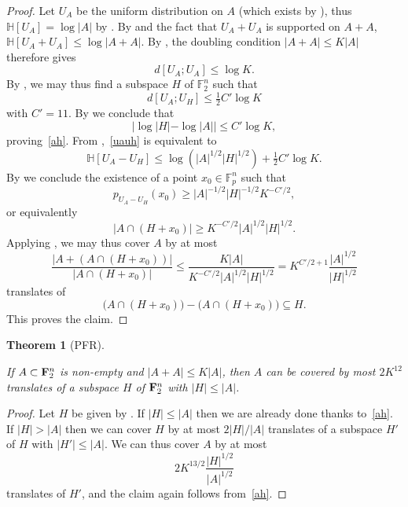 \documentclass[10pt,a4paper]{article}
\newtheorem{theorem}{Theorem}
\newcommand{\lean}[1]{}
\newcommand{\uses}[1]{}
\newcommand{\leanok}{}
\newcommand{\F}{\mathbb{F}}
\newcommand{\bbH}{\mathbb{H}}
\begin{document}
\begin{proof}
\uses{entropy-pfr, unif-exist, uniform-entropy-II, jensen-bound,ruz-dist-def,ruzsa-diff,bound-conc,ruz-cov}\leanok
  Let $U_A$ be the uniform distribution on $A$ (which exists by ), thus $\bbH[U_A] = \log |A|$ by . By  and the fact that $U_A + U_A$ is supported on $A + A$, $\bbH[U_A + U_A] \leq \log|A+A|$. By , the doubling condition $|A+A| \leq K|A|$ therefore gives
  \[d[U_A;U_A] \leq \log K.\]
  By , we may thus find a subspace $H$ of $\F_2^n$ such that
  \begin{equation}\label{uauh} d[U_A;U_H] \leq \tfrac{1}{2} C' \log K\end{equation}
  with $C' = 11$.
  By  we conclude that
  \begin{equation*}
    |\log |H| - \log |A|| \leq C' \log K,
  \end{equation*}
  proving~\eqref{ah}.
  From ,~\eqref{uauh} is equivalent to
  \[\bbH[U_A - U_H] \leq \log( |A|^{1/2} |H|^{1/2}) + \tfrac{1}{2} C' \log K.\]
  By  we conclude the existence of a point $x_0 \in \F_p^n$ such that
  \[p_{U_A-U_H}(x_0) \geq |A|^{-1/2} |H|^{-1/2} K^{-C'/2},\]
  or equivalently
  \[|A \cap (H + x_0)| \geq K^{-C'/2} |A|^{1/2} |H|^{1/2}.\]
  Applying , we may thus cover $A$ by at most
  \[\frac{|A + (A \cap (H+x_0))|}{|A \cap (H + x_0)|} \leq \frac{K|A|}{K^{-C'/2} |A|^{1/2} |H|^{1/2}} = K^{C'/2+1} \frac{|A|^{1/2}}{|H|^{1/2}}\]
  translates of
  \[\bigl(A \cap (H + x_0)\bigr) - \bigl(A \cap (H + x_0)\bigr) \subseteq H.\]
  This proves the claim.
\end{proof}


\begin{theorem}[PFR]\label{pfr}
\lean{PFR_conjecture}\leanok
If $A \subset {\bf F}_2^n$ is non-empty and $|A+A| \leq K|A|$, then $A$ can be covered by most $2K^{12}$ translates of a subspace $H$ of ${\bf F}_2^n$ with $|H| \leq |A|$.
\end{theorem}

\begin{proof}
  \uses{pfr_aux}\leanok
  Let $H$ be given by .
  If $|H| \leq |A|$ then we are already done thanks to~\eqref{ah}.  If $|H| > |A|$ then we can cover $H$ by at most $2 |H|/|A|$ translates of a subspace $H'$ of $H$ with $|H'| \leq |A|$.  We can thus cover $A$ by at most
  \[2K^{13/2} \frac{|H|^{1/2}}{|A|^{1/2}}\]
  translates of $H'$, and the claim again follows from~\eqref{ah}.
\end{proof}
\end{document}
